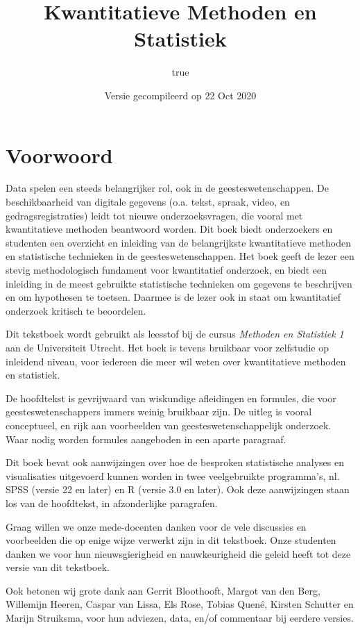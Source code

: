 \documentclass[
]{book}
\title{Kwantitatieve Methoden en Statistiek}
\author{true}
\date{Versie gecompileerd op 22 Oct 2020}
\begin{document}
\maketitle

{
\setcounter{tocdepth}{1}
\tableofcontents
}
\hypertarget{voorwoord}{%
\chapter*{Voorwoord}\label{voorwoord}}

Data spelen een steeds belangrijker rol, ook in de geesteswetenschappen.
De beschikbaarheid van digitale gegevens (o.a. tekst, spraak, video, en gedragsregistraties) leidt tot nieuwe onderzoeksvragen, die vooral met kwantitatieve methoden beantwoord worden.
Dit boek biedt onderzoekers en studenten een overzicht en inleiding van de belangrijkste kwantitatieve methoden en statistische technieken in de geesteswetenschappen. Het boek geeft de lezer een stevig methodologisch fundament voor kwantitatief onderzoek, en biedt een inleiding in de meest gebruikte statistische technieken om gegevens te beschrijven en om hypothesen te toetsen. Daarmee is de lezer ook in staat om kwantitatief onderzoek kritisch te beoordelen.

Dit tekstboek wordt gebruikt als leesstof bij de cursus \emph{Methoden en Statistiek 1} aan de Universiteit Utrecht. Het boek is tevens bruikbaar voor zelfstudie op inleidend niveau, voor iedereen die meer wil weten over kwantitatieve methoden en statistiek.

De hoofdtekst is gevrijwaard van wiskundige afleidingen en formules, die voor geesteswetenschappers immers weinig bruikbaar zijn. De uitleg is vooral conceptueel, en rijk aan voorbeelden van geesteswetenschappelijk onderzoek. Waar nodig worden formules aangeboden in een aparte paragraaf.

Dit boek bevat ook aanwijzingen over hoe de besproken statistische analyses en visualisaties uitgevoerd kunnen worden in twee veelgebruikte programma's, nl. SPSS (versie 22 en later) en R (versie 3.0 en later). Ook deze aanwijzingen staan los van de hoofdtekst, in afzonderlijke paragrafen.

Graag willen we onze mede-docenten danken voor de vele discussies en voorbeelden die op enige wijze verwerkt zijn in dit tekstboek. Onze studenten danken we voor hun nieuwsgierigheid en nauwkeurigheid die geleid heeft tot deze versie van dit tekstboek.

Ook betonen wij grote dank aan
Gerrit Bloothooft,
Margot van den Berg,
Willemijn Heeren,
Caspar van Lissa,
Els Rose,
Tobias Quené,
Kirsten Schutter
en Marijn Struiksma,
voor hun adviezen, data, en/of commentaar bij eerdere versies.
\end{document}
